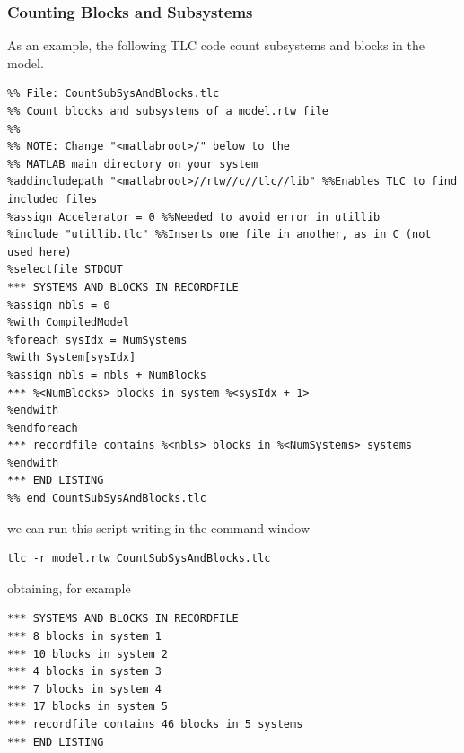 \subsubsection{Counting Blocks and Subsystems}
As an example, the following TLC code count subsystems and blocks in the model.
\begin{lstlisting}
%% File: CountSubSysAndBlocks.tlc
%% Count blocks and subsystems of a model.rtw file
%%
%% NOTE: Change "<matlabroot>/" below to the
%% MATLAB main directory on your system
%addincludepath "<matlabroot>//rtw//c//tlc//lib" %%Enables TLC to find included files
%assign Accelerator = 0 %%Needed to avoid error in utillib
%include "utillib.tlc" %%Inserts one file in another, as in C (not used here)
%selectfile STDOUT
*** SYSTEMS AND BLOCKS IN RECORDFILE
%assign nbls = 0
%with CompiledModel
%foreach sysIdx = NumSystems
%with System[sysIdx]
%assign nbls = nbls + NumBlocks
*** %<NumBlocks> blocks in system %<sysIdx + 1>
%endwith
%endforeach
*** recordfile contains %<nbls> blocks in %<NumSystems> systems
%endwith
*** END LISTING
%% end CountSubSysAndBlocks.tlc
\end{lstlisting}
we can run this script writing in the command window
\begin{verbatim}
tlc -r model.rtw CountSubSysAndBlocks.tlc
\end{verbatim}
obtaining, for example
\begin{verbatim}
*** SYSTEMS AND BLOCKS IN RECORDFILE
*** 8 blocks in system 1
*** 10 blocks in system 2
*** 4 blocks in system 3
*** 7 blocks in system 4
*** 17 blocks in system 5
*** recordfile contains 46 blocks in 5 systems
*** END LISTING
\end{verbatim}


